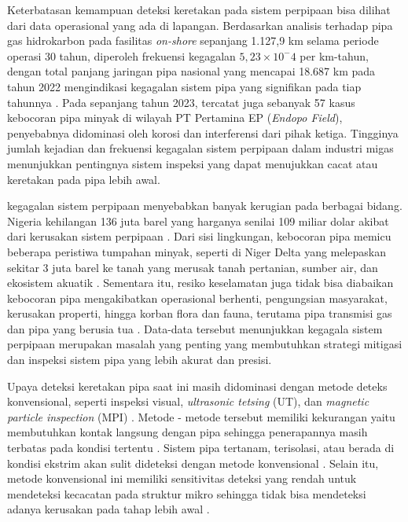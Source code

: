 \documentclass[12pt,a4paper]{report}
\begin{document}
Keterbatasan kemampuan deteksi keretakan pada sistem perpipaan bisa dilihat dari data operasional yang ada di lapangan. Berdasarkan analisis terhadap pipa gas hidrokarbon pada fasilitas \textit{on-shore} sepanjang 1.127,9 km selama periode
operasi 30 tahun, diperoleh frekuensi kegagalan $5,23 \times 10^-4$ per km-tahun, dengan total panjang jaringan pipa nasional yang mencapai 18.687 km pada tahun 2022 mengindikasi kegagalan sistem pipa yang 
signifikan pada tiap tahunnya \cite{Mukharror2024}. Pada sepanjang tahun 2023, tercatat juga sebanyak 57 kasus kebocoran pipa minyak di wilayah PT Pertamina EP (\textit{Endopo Field}), penyebabnya didominasi oleh korosi dan interferensi dari pihak ketiga\cite{Armelita}. Tingginya jumlah kejadian dan 
frekuensi kegagalan sistem perpipaan dalam industri migas menunjukkan pentingnya sistem inspeksi yang dapat menujukkan cacat atau keretakan pada pipa lebih awal. 

kegagalan sistem perpipaan menyebabkan banyak kerugian pada berbagai bidang\cite{ref8}. 
Nigeria kehilangan 136 juta barel yang harganya senilai 109 miliar dolar akibat dari kerusakan sistem perpipaan \cite{Umar2021}. 
Dari sisi lingkungan, kebocoran pipa memicu beberapa peristiwa tumpahan minyak, seperti di Niger
Delta yang melepaskan sekitar 3 juta barel ke tanah yang merusak tanah pertanian, sumber air, dan
ekosistem akuatik \cite{Belvederesi2018}. Sementara itu, resiko keselamatan juga tidak bisa diabaikan kebocoran pipa
mengakibatkan operasional berhenti, pengungsian masyarakat, kerusakan properti, hingga korban flora dan
fauna, terutama pipa transmisi gas dan pipa yang berusia tua \cite{ref11}. Data-data tersebut menunjukkan kegagala
sistem perpipaan merupakan masalah yang penting yang membutuhkan strategi mitigasi dan inspeksi sistem
pipa yang lebih akurat dan presisi.

Upaya deteksi keretakan pipa saat ini masih didominasi dengan metode deteks konvensional, seperti inspeksi visual, 
\textit{ultrasonic tetsing} (UT), dan \textit{magnetic particle inspection} (MPI) \cite{Huang2024}. Metode - metode tersebut memiliki 
kekurangan yaitu membutuhkan kontak langsung dengan pipa
sehingga penerapannya masih terbatas pada kondisi tertentu \cite{Ma2021}. Sistem pipa tertanam, terisolasi, atau berada di kondisi 
ekstrim akan sulit dideteksi dengan metode konvensional \cite{Tuninetti2025}\cite{Huang2024_2}. Selain itu, metode konvensional ini memiliki sensitivitas deteksi 
yang rendah untuk mendeteksi kecacatan pada struktur 
mikro sehingga tidak bisa mendeteksi adanya kerusakan pada tahap lebih awal \cite{Ma2025}\cite{Yu2024}.
\end{document}
